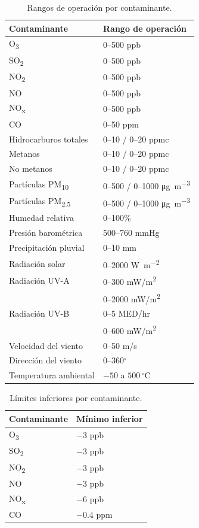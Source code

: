 \begin{table}[H]
\centering
\footnotesize
\caption{Rangos de operación por contaminante.}
\label{tab:rangos_operacion}
\begin{tabular}{@{}ll@{}}
\toprule
\textbf{Contaminante} & \textbf{Rango de operación} \\
\midrule
O\textsubscript{3} & 0--500 ppb \\
SO\textsubscript{2} & 0--500 ppb \\
NO\textsubscript{2} & 0--500 ppb \\
NO & 0--500 ppb \\
NO\textsubscript{x} & 0--500 ppb \\
CO & 0--50 ppm \\
Hidrocarburos totales & 0--10 / 0--20 ppmc \\
Metanos & 0--10 / 0--20 ppmc \\
No metanos & 0--10 / 0--20 ppmc \\
Partículas PM\textsubscript{10} & 0--500 / 0--1000 \si{\micro\gram\per\cubic\meter} \\
Partículas PM\textsubscript{2.5} & 0--500 / 0--1000 \si{\micro\gram\per\cubic\meter} \\
Humedad relativa & 0--100\% \\
Presión barométrica & 500--760 mmHg \\
Precipitación pluvial & 0--10 mm \\
Radiación solar & 0--2000 \si{\watt\per\square\meter} \\
Radiación UV-A & 0--300 mW/m\textsuperscript{2} \\
                & 0--2000 mW/m\textsuperscript{2} \\
Radiación UV-B & 0--5 MED/hr \\
                & 0--600 mW/m\textsuperscript{2} \\
Velocidad del viento & 0--50 m/s \\
Dirección del viento & 0--360$^{\circ}$ \\
Temperatura ambiental & $-50$ a $500\,^{\circ}\mathrm{C}$ \\
\bottomrule
\end{tabular}
\end{table}

\begin{table}[H]
\centering
\footnotesize
\caption{Límites inferiores por contaminante.}
\label{tab:limites_inferiores}
\begin{tabular}{@{}ll@{}}
\toprule
\textbf{Contaminante} & \textbf{Mínimo inferior} \\
\midrule
O\textsubscript{3} & $-3$ ppb \\
SO\textsubscript{2} & $-3$ ppb \\
NO\textsubscript{2} & $-3$ ppb \\
NO & $-3$ ppb \\
NO\textsubscript{x} & $-6$ ppb \\
CO & $-0.4$ ppm \\
\bottomrule
\end{tabular}
\end{table}

